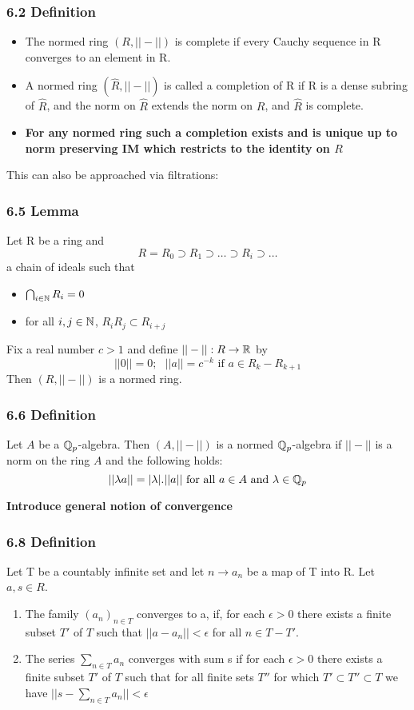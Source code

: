 \subsubsection*{6.2 Definition}
\begin{itemize}
\item The normed ring $(R,||-||)$ is complete if every Cauchy sequence in R converges to an element in R.
\item A normed ring $(\hat R, ||-||)$ is called a completion of R if R is a dense subring of $\hat R$, and the norm on $\hat R$ extends the norm on $R$, and $\hat R$ is complete.
\item \textbf{For any normed ring such a completion exists and is unique up to norm preserving IM which restricts to the identity on $R$}
\end{itemize}

This can also be approached via filtrations:

\subsubsection*{6.5 Lemma}
Let R be a ring and 
$$R=R_0\supset R_1 \supset \dots \supset R_i\supset\dots$$
a chain of ideals such that
\begin{itemize}
\item $\bigcap_{i\in\mathbb N} R_i = 0$
\item for all $i,j\in\mathbb N$, $R_i R_j\subset R_{i+j}$
\end{itemize}

Fix a real number $c>1$ and define $||-||:R\rightarrow \mathbb R$ by
$$||0||=0;\,\,\,\,||a|| = c^{-k}\text{ if }a \in R_k - R_{k+1}$$
Then $(R,||-||)$ is a normed ring.

\subsubsection*{6.6 Definition}
Let $A$ be a $\mathbb Q_p$-algebra. Then $(A, ||-||)$ is a normed $\mathbb Q_p$-algebra if $||-||$ is a norm on the ring $A$ and the following holds:
$$||\lambda a|| = |\lambda|.||a||\text{ for all }a\in A \text{ and }\lambda\in\mathbb Q_p$$

\textbf{Introduce general notion of convergence}

\subsubsection*{6.8 Definition}
Let T be a countably infinite set and let $n\rightarrow a_n$ be a map of T into R. Let $a,s\in R$.
\begin{enumerate}
\item The family $(a_n)_{n\in T}$ converges to a, if, for each $\epsilon>0$ there exists a finite subset $T'$ of $T$ such that $||a-a_n||<\epsilon$ for all $n\in T -T'$.

\item The series $\sum_{n\in T} a_n$ converges with sum s if for each $\epsilon > 0$ there exists a finite subset $T'$ of $T$ such that for all finite sets $T''$ for which $T'\subset T''\subset T$ we have $||s-\sum_{n\in T} a_n||<\epsilon$
\end{enumerate}


